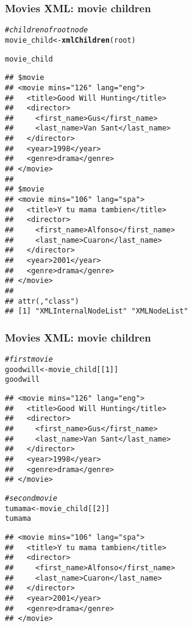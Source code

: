 \documentclass[12pt]{beamer}\usepackage[]{graphicx}\usepackage[]{color}
\makeatletter
\newcommand{\hlnum}[1]{\textcolor[rgb]{0.686,0.059,0.569}{#1}}%
\newcommand{\hlcom}[1]{\textcolor[rgb]{0.678,0.584,0.686}{\textit{#1}}}%
\newcommand{\hlstd}[1]{\textcolor[rgb]{0.345,0.345,0.345}{#1}}%
\newcommand{\hlkwb}[1]{\textcolor[rgb]{0.69,0.353,0.396}{#1}}%
\newcommand{\hlkwd}[1]{\textcolor[rgb]{0.737,0.353,0.396}{\textbf{#1}}}%
\newenvironment{kframe}{%
 \def\at@end@of@kframe{}%
 \ifinner\ifhmode%
  \def\at@end@of@kframe{\end{minipage}}%
  \begin{minipage}{\columnwidth}%
 \fi\fi%
 \def\FrameCommand##1{\hskip\@totalleftmargin \hskip-\fboxsep
 \colorbox{shadecolor}{##1}\hskip-\fboxsep
     \hskip-\linewidth \hskip-\@totalleftmargin \hskip\columnwidth}%
 \MakeFramed {\advance\hsize-\width
   \@totalleftmargin\z@ \linewidth\hsize
   \@setminipage}}%
 {\par\unskip\endMakeFramed%
 \at@end@of@kframe}
\newenvironment{knitrout}{}{} %
\makeatother
\begin{document}

\begin{frame}[fragile]
\frametitle{Movies XML: movie children}

\begin{knitrout}\tiny
{}\color{fgcolor}\begin{kframe}
\begin{alltt}
\hlcom{# children of root node}
\hlstd{movie_child} \hlkwb{<-} \hlkwd{xmlChildren}\hlstd{(root)}

\hlstd{movie_child}
\end{alltt}
\begin{verbatim}
## $movie
## <movie mins="126" lang="eng">
##   <title>Good Will Hunting</title>
##   <director>
##     <first_name>Gus</first_name>
##     <last_name>Van Sant</last_name>
##   </director>
##   <year>1998</year>
##   <genre>drama</genre>
## </movie> 
## 
## $movie
## <movie mins="106" lang="spa">
##   <title>Y tu mama tambien</title>
##   <director>
##     <first_name>Alfonso</first_name>
##     <last_name>Cuaron</last_name>
##   </director>
##   <year>2001</year>
##   <genre>drama</genre>
## </movie> 
## 
## attr(,"class")
## [1] "XMLInternalNodeList" "XMLNodeList"
\end{verbatim}
\end{kframe}
\end{knitrout}

\end{frame}


\begin{frame}[fragile]
\frametitle{Movies XML: movie children}
\begin{knitrout}\tiny
{}\color{fgcolor}\begin{kframe}
\begin{alltt}
\hlcom{# first movie}
\hlstd{goodwill} \hlkwb{<-} \hlstd{movie_child[[}\hlnum{1}\hlstd{]]}
\hlstd{goodwill}
\end{alltt}
\begin{verbatim}
## <movie mins="126" lang="eng">
##   <title>Good Will Hunting</title>
##   <director>
##     <first_name>Gus</first_name>
##     <last_name>Van Sant</last_name>
##   </director>
##   <year>1998</year>
##   <genre>drama</genre>
## </movie>
\end{verbatim}
\begin{alltt}
\hlcom{# second movie}
\hlstd{tumama} \hlkwb{<-} \hlstd{movie_child[[}\hlnum{2}\hlstd{]]}
\hlstd{tumama}
\end{alltt}
\begin{verbatim}
## <movie mins="106" lang="spa">
##   <title>Y tu mama tambien</title>
##   <director>
##     <first_name>Alfonso</first_name>
##     <last_name>Cuaron</last_name>
##   </director>
##   <year>2001</year>
##   <genre>drama</genre>
## </movie>
\end{verbatim}
\end{kframe}
\end{knitrout}

\end{frame}
\end{document}
